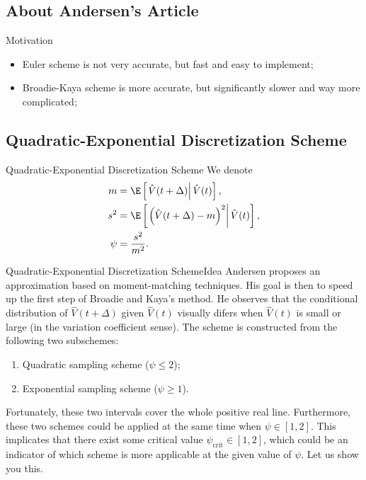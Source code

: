 \subsection{About Andersen's Article}
\begin{frame}{Motivation}
    \begin{itemize}
        \item Euler scheme is not very accurate, but fast and easy to implement;
        \item Broadie-Kaya scheme is more accurate, but significantly slower and way more complicated;
    \end{itemize}
\end{frame}

\subsection{Quadratic-Exponential Discretization Scheme}
    \begin{frame}{Quadratic-Exponential Discretization Scheme}{}\label{frame:Andersen:denotemeanstd}
        We denote 
        \begin{align}
            m    &= \E\left[\left.\hat{V}(t+\Delta)\right| \hat{V}(t)\right], \\
            s^2  &= \E\left[\left.\left(\hat{V}(t+\Delta) - m\right)^2\right| \hat{V}(t)\right], \\
            \psi &= \frac{s^2}{m^2}.
        \end{align}
    \end{frame}

    \begin{frame}{Quadratic-Exponential Discretization Scheme}{Idea}
        Andersen proposes an approximation based on moment-matching techniques. His goal is then to speed up the first step of Broadie and Kaya's method.
        He observes that the conditional distribution of $\hat{V}(t+\Delta)$ given $\hat{V}(t)$ visually difers when $\hat{V}(t)$ is small or large (in the variation coefficient sense).
        The scheme is constructed from the following two subschemes:
        \begin{enumerate}
            \item Quadratic sampling scheme ($\psi \leq 2$);
            \item Exponential sampling scheme ($\psi \geq 1$).
        \end{enumerate}
        Fortunately, these two intervals cover the whole positive real line. Furthermore, these two schemes could be applied at the same time when $\psi\in[1, 2]$. This implicates that there exist some critical value $\psi_{\text{crit}}\in[1, 2]$, which could be an indicator of which scheme is more applicable at the given value of $\psi$. Let us show you this.
    \end{frame}

